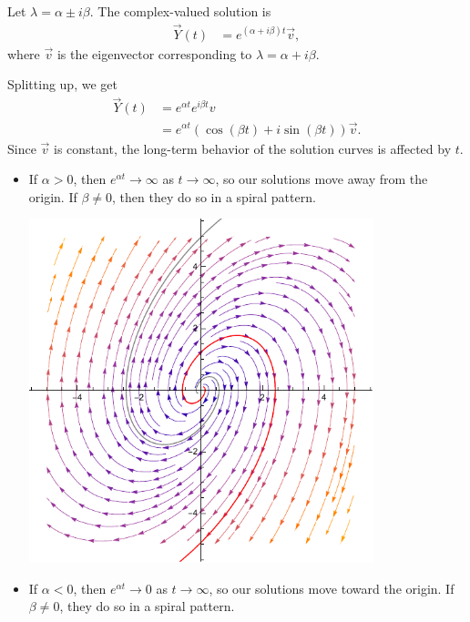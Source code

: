 \documentclass[10pt]{mypackage}
\begin{document}
\begin{example}
  Let $\lambda = \alpha \pm i\beta$. The complex-valued solution is
  \begin{align*}
    \vec{Y}(t) &= e^{\left(\alpha + i\beta\right)t} \vec{v},
  \end{align*}
  where $\vec{v}$ is the eigenvector corresponding to $\lambda = \alpha + i\beta$.\newline

  Splitting up, we get
  \begin{align*}
    \vec{Y}(t) &= e^{\alpha t}e^{i\beta t}v\\
               &= e^{\alpha t}\left(\cos\left(\beta t\right) + i\sin\left(\beta t\right)\right)\vec{v}.
  \end{align*}
  Since $\vec{v}$ is constant, the long-term behavior of the solution curves is affected by $t$.
\begin{itemize}
  \item If $\alpha > 0$, then $e^{\alpha t} \rightarrow \infty$ as $t\rightarrow\infty$, so our solutions move away from the origin. If $\beta \neq 0$, then they do so in a spiral pattern.
    \begin{center}
      \includegraphics[width=10cm]{images/positive_real_part.pdf}
    \end{center}
  \item If $\alpha < 0$, then $e^{\alpha t}\rightarrow 0$ as $t\rightarrow\infty$, so our solutions move toward the origin. If $\beta \neq 0$, they do so in a spiral pattern.
    \begin{center}

\end{center}
\end{itemize}
\end{example}
\end{document}
